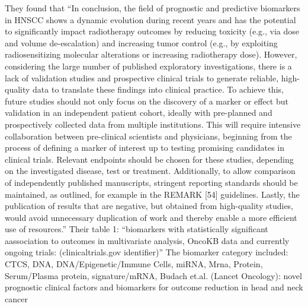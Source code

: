 \documentclass{article}%
\begin{document}
\newline%
\newline%
%
They found that “In conclusion, the field of prognostic and predictive biomarkers in HNSCC shows a dynamic evolution during recent years and has the potential to significantly impact radiotherapy outcomes by reducing toxicity (e.g., via dose and volume de{-}escalation) and increasing tumor control (e.g., by exploiting radiosensitizing molecular alterations or increasing radiotherapy dose). However, considering the large number of published exploratory investigations, there is a lack of validation studies and prospective clinical trials to generate reliable, high{-}quality data to translate these findings into clinical practice. To achieve this, future studies should not only focus on the discovery of a marker or effect but validation in an independent patient cohort, ideally with pre{-}planned and prospectively collected data from multiple institutions. This will require intensive collaboration between pre{-}clinical scientists and physicians, beginning from the process of defining a marker of interest up to testing promising candidates in clinical trials. Relevant endpoints should be chosen for these studies, depending on the investigated disease, test or treatment. Additionally, to allow comparison of independently published manuscripts, stringent reporting standards should be maintained, as outlined, for example in the REMARK {[}54{]} guidelines. Lastly, the publication of results that are negative, but obtained from high{-}quality studies, would avoid unnecessary duplication of work and thereby enable a more efficient use of resources.”%
\newline%
\newline%
%
Their table 1: “biomarkers with statistically significant aassociation to outcomes in multivariate analysis, OncoKB data and currently ongoing trials: (clinicaltrials.gov identifier)”%
\newline%
\newline%
%
%
\newline%
\newline%
%
The biomarker category included: CTCS, DNA, DNA/Epigenetic/Immune Cells, miRNA, Mrna, Protein, Serum/Plasma protein, signature/mRNA,%
\newline%
\newline%
%
Budach et.al. (Lancet Oncology): novel prognostic clinical factors and biomarkers for outcome reduction in head and neck cancer %
\newline%
\newline%
\end{document}

